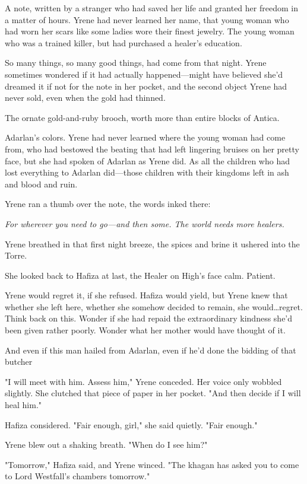 A note, written by a stranger who had saved her life and granted her freedom in a matter of hours. Yrene had never learned her name, that young woman who had worn her scars like some ladies wore their finest jewelry. The young woman who was a trained killer, but had purchased a healer's education.

So many things, so many good things, had come from that night. Yrene sometimes wondered if it had actually happened---might have believed she'd dreamed it if not for the note in her pocket, and the second object Yrene had never sold, even when the gold had thinned.

The ornate gold-and-ruby brooch, worth more than entire blocks of Antica.

Adarlan's colors. Yrene had never learned where the young woman had come from, who had bestowed the beating that had left lingering bruises on her pretty face, but she had spoken of Adarlan as Yrene did. As all the children who had lost everything to Adarlan did---those children with their kingdoms left in ash and blood and ruin.

Yrene ran a thumb over the note, the words inked there:

\emph{For wherever you need to go---and then some. The world needs more healers.}

Yrene breathed in that first night breeze, the spices and brine it ushered into the Torre.

She looked back to Hafiza at last, the Healer on High's face calm. Patient.

Yrene would regret it, if she refused. Hafiza would yield, but Yrene knew that whether she left here, whether she somehow decided to remain, she would\ldots regret. Think back on this. Wonder if she had repaid the extraordinary kindness she'd been given rather poorly. Wonder what her mother would have thought of it.

And even if this man hailed from Adarlan, even if he'd done the bidding of that butcher 

"I will meet with him. Assess him," Yrene conceded. Her voice only wobbled slightly. She clutched that piece of paper in her pocket. "And then decide if I will heal him."

Hafiza considered. "Fair enough, girl," she said quietly. "Fair enough."

Yrene blew out a shaking breath. "When do I see him?"

"Tomorrow," Hafiza said, and Yrene winced. "The khagan has asked you to come to Lord Westfall's chambers tomorrow."

